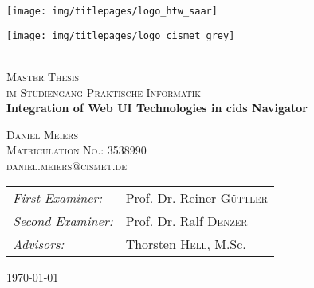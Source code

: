 \begin{titlepage}
\begin{center}

\begin{minipage}[t]{0.4\textwidth}
	\begin{flushleft}
	\texttt{[image: img/titlepages/logo\_htw\_saar]}
	\end{flushleft}
\end{minipage}
\hfill
\begin{minipage}[t]{0.4\textwidth}
	\begin{flushright}
	\texttt{[image: img/titlepages/logo\_cismet\_grey]}
	\end{flushright}
\end{minipage}



~\\[1cm]

\textsc{\LARGE Master Thesis}\\
\textsc{\large im Studiengang Praktische Informatik}\\[1.5cm]
\hspace{0.4cm}
{ \huge \bfseries Integration of Web UI Technologies in cids Navigator \\[0.4cm] }

\hspace{1.5cm}

\textsc{\large Daniel Meiers}\\[0.2cm]
\textsc{\large Matriculation No.: 3538990}\\[0.2cm]
\textsc{\large daniel.meiers@cismet.de}\\[4cm]

\begin{tabular}[0.8\textwidth]{l l}
\emph{First Examiner:} & Prof. Dr. Reiner \textsc{Güttler} \\
\emph{Second Examiner:} & Prof. Dr. Ralf \textsc{Denzer} \\
\emph{Advisors:} & Thorsten \textsc{Hell}, M.Sc.
\end{tabular}


\vfill

{\large \today}

\end{center}
\end{titlepage}
